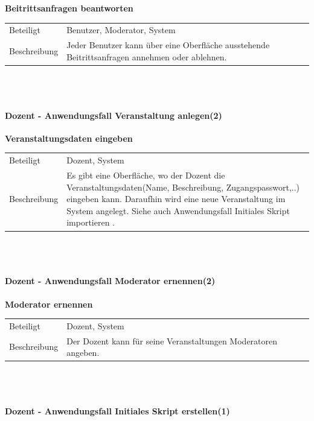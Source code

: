 \documentclass[12pt,a4paper]{article}
\begin{document}
{\textbf{Beitrittsanfragen beantworten}\\
	\begin{tabular}{l|p{12cm}}
		\hline 
		Beteiligt & Benutzer, Moderator, System \\ 
		Beschreibung & Jeder Benutzer kann über eine Oberfläche ausstehende Beitrittsanfragen annehmen oder ablehnen. \\ 
	\end{tabular}\\\\
	
	
	\paragraph{Dozent - Anwendungsfall \glqq Veranstaltung anlegen\grqq (2)}\mbox{}
	
	\textbf{Veranstaltungsdaten eingeben}\\
	\begin{tabular}{l|p{12cm}}
		\hline 
		Beteiligt & Dozent, System \\ 
		Beschreibung & Es gibt eine Oberfläche, wo der Dozent die Veranstaltungsdaten(Name, Beschreibung, Zugangspasswort,..) eingeben kann. Daraufhin wird eine neue Veranstaltung im System angelegt. Siehe auch Anwendungsfall \glqq Initiales Skript importieren \grqq . \\ 
	\end{tabular} \\\\
	
	
	\paragraph{Dozent - Anwendungsfall \glqq Moderator ernennen\grqq (2)}\mbox{}
	
	\textbf{Moderator ernennen}\\
	\begin{tabular}{l|p{12cm}}
		\hline 
		Beteiligt & Dozent, System \\ 
		Beschreibung & Der Dozent kann für seine Veranstaltungen Moderatoren angeben. \\ 
	\end{tabular}\\\\
	
	
	\paragraph{Dozent - Anwendungsfall \glqq Initiales Skript erstellen\grqq (1)}\mbox{}
	
}
\end{document}
